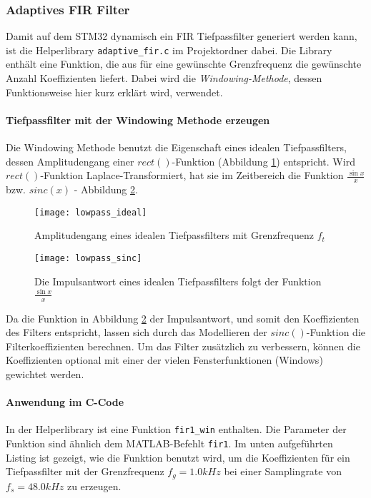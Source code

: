 \subsubsection{Adaptives FIR Filter}
\label{sec:LibFIRAdaptive}

Damit auf dem STM32 dynamisch ein FIR Tiefpassfilter generiert werden kann, ist die Helperlibrary \texttt{adaptive\_fir.c} im Projektordner dabei.
Die Library enthält eine Funktion, die aus für eine gewünschte Grenzfrequenz die gewünschte Anzahl Koeffizienten liefert.
Dabei wird die \textit{Windowing-Methode}, dessen Funktionsweise hier kurz erklärt wird, verwendet.

\paragraph{Tiefpassfilter mit der Windowing Methode erzeugen}

Die Windowing Methode benutzt die Eigenschaft eines idealen Tiefpassfilters, dessen Amplitudengang einer $rect()$-Funktion (Abbildung \ref{pic:lowpass_ideal}) entspricht.
Wird $rect()$-Funktion Laplace-Transformiert, hat sie im Zeitbereich die Funktion $\frac{\sin{x}}{x}$ bzw. $sinc(x)$ - Abbildung \ref{pic:lowpass_sinc}.

\begin{figure}[H]
	\centering
	\texttt{[image: lowpass\_ideal]}
	\caption{Amplitudengang eines idealen Tiefpassfilters mit Grenzfrequenz $f_t$}
	\label{pic:lowpass_ideal}
\end{figure}

\begin{figure}[H]
	\centering
	\texttt{[image: lowpass\_sinc]}
	\caption{Die Impulsantwort eines idealen Tiefpassfilters folgt der Funktion $\frac{\sin{x}}{x}$}
	\label{pic:lowpass_sinc}
\end{figure}

Da die Funktion in Abbildung \ref{pic:lowpass_sinc} der Impulsantwort, und somit den Koeffizienten des Filters entspricht, lassen sich durch das Modellieren der $sinc()$-Funktion die Filterkoeffizienten berechnen.
Um das Filter zusätzlich zu verbessern, können die Koeffizienten optional mit einer der vielen Fensterfunktionen (Windows) gewichtet werden.

\paragraph{Anwendung im C-Code}

In der Helperlibrary ist eine Funktion \texttt{fir1\_win} enthalten.
Die Parameter der Funktion sind ähnlich dem MATLAB-Befehlt \texttt{fir1}.
Im unten aufgeführten Listing ist gezeigt, wie die Funktion benutzt wird, um die Koeffizienten für ein Tiefpassfilter mit der Grenzfrequenz $f_g=1.0\si{kHz}$ bei einer Samplingrate von $f_s=48.0\si{kHz}$ zu erzeugen.



